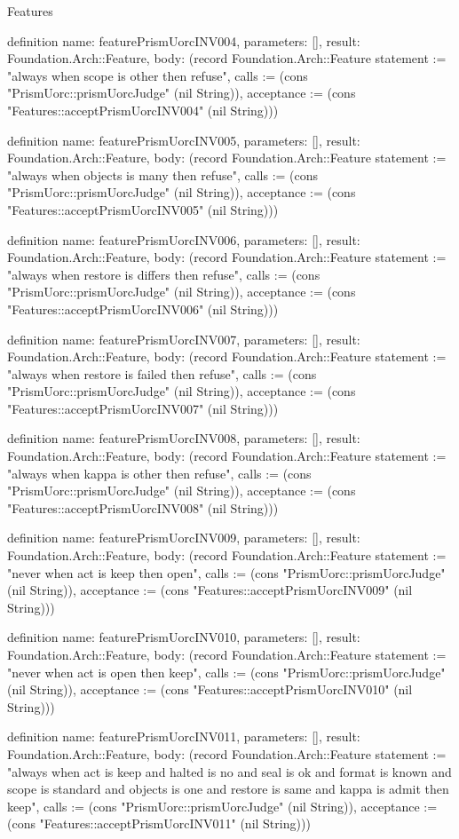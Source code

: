 \begin{lexlean}{Features}
\begin{semanticmodule}
definition{
  name: featurePrismUorcINV004,
  parameters: [],
  result: Foundation.Arch::Feature,
  body: (record Foundation.Arch::Feature {statement := "always when scope is other then refuse", calls := (cons "PrismUorc::prismUorcJudge" (nil String)), acceptance := (cons "Features::acceptPrismUorcINV004" (nil String))})
}

definition{
  name: featurePrismUorcINV005,
  parameters: [],
  result: Foundation.Arch::Feature,
  body: (record Foundation.Arch::Feature {statement := "always when objects is many then refuse", calls := (cons "PrismUorc::prismUorcJudge" (nil String)), acceptance := (cons "Features::acceptPrismUorcINV005" (nil String))})
}

definition{
  name: featurePrismUorcINV006,
  parameters: [],
  result: Foundation.Arch::Feature,
  body: (record Foundation.Arch::Feature {statement := "always when restore is differs then refuse", calls := (cons "PrismUorc::prismUorcJudge" (nil String)), acceptance := (cons "Features::acceptPrismUorcINV006" (nil String))})
}

definition{
  name: featurePrismUorcINV007,
  parameters: [],
  result: Foundation.Arch::Feature,
  body: (record Foundation.Arch::Feature {statement := "always when restore is failed then refuse", calls := (cons "PrismUorc::prismUorcJudge" (nil String)), acceptance := (cons "Features::acceptPrismUorcINV007" (nil String))})
}

definition{
  name: featurePrismUorcINV008,
  parameters: [],
  result: Foundation.Arch::Feature,
  body: (record Foundation.Arch::Feature {statement := "always when kappa is other then refuse", calls := (cons "PrismUorc::prismUorcJudge" (nil String)), acceptance := (cons "Features::acceptPrismUorcINV008" (nil String))})
}

definition{
  name: featurePrismUorcINV009,
  parameters: [],
  result: Foundation.Arch::Feature,
  body: (record Foundation.Arch::Feature {statement := "never when act is keep then open", calls := (cons "PrismUorc::prismUorcJudge" (nil String)), acceptance := (cons "Features::acceptPrismUorcINV009" (nil String))})
}

definition{
  name: featurePrismUorcINV010,
  parameters: [],
  result: Foundation.Arch::Feature,
  body: (record Foundation.Arch::Feature {statement := "never when act is open then keep", calls := (cons "PrismUorc::prismUorcJudge" (nil String)), acceptance := (cons "Features::acceptPrismUorcINV010" (nil String))})
}

definition{
  name: featurePrismUorcINV011,
  parameters: [],
  result: Foundation.Arch::Feature,
  body: (record Foundation.Arch::Feature {statement := "always when act is keep and halted is no and seal is ok and format is known and scope is standard and objects is one and restore is same and kappa is admit then keep", calls := (cons "PrismUorc::prismUorcJudge" (nil String)), acceptance := (cons "Features::acceptPrismUorcINV011" (nil String))})
}


\end{semanticmodule}
\end{lexlean}
